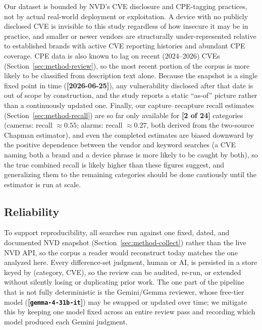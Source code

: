 \documentclass[conference]{IEEEtran}
\newcommand{\stub}[1][?]{{\color{red}\textbf{[#1]}}}
\begin{document}
Our dataset is bounded by NVD's CVE disclosure and CPE-tagging practices, not by actual
real-world deployment or exploitation. A device with no publicly disclosed CVE is
invisible to this study regardless of how insecure it may be in practice, and smaller or
newer vendors are structurally under-represented relative to established brands with
active CVE reporting histories and abundant CPE coverage. CPE data is also known to lag
on recent (2024--2026) CVEs (Section~\ref{sec:method-review}), so the most recent portion
of the corpus is more likely to be classified from description text alone. Because the
snapshot is a single fixed point in time (\stub[2026-06-25]), any vulnerability disclosed
after that date is out of scope by construction, and the study reports a static
``as-of'' picture rather than a continuously updated one. Finally, our capture--recapture
recall estimates (Section~\ref{sec:method-recall}) are so far only available for
\stub[2 of 24] categories (cameras: recall $\approx 0.55$; alarms: recall $\approx 0.27$,
both derived from the two-source Chapman estimator), and even the completed estimates are
biased downward by the positive dependence between the vendor and keyword searches (a CVE
naming both a brand and a device phrase is more likely to be caught by both), so the true
combined recall is likely higher than these figures suggest, and generalizing them to the
remaining categories should be done cautiously until the estimator is run at scale.

\subsection{Reliability}
\label{sec:threats-reliability}

To support reproducibility, all searches run against one fixed, dated, and documented
NVD snapshot (Section~\ref{sec:method-collect}) rather than the live NVD API, so the
corpus a reader would reconstruct today matches the one analyzed here. Every
difference-set judgment, human or AI, is persisted in a store keyed by
(category, CVE), so the review can be audited, re-run, or extended without silently
losing or duplicating prior work. The one part of the pipeline that is not fully
deterministic is the Gemini/Gemma reviewer, whose free-tier model
(\stub[\texttt{gemma-4-31b-it}]) may be swapped or updated over time; we mitigate this by
keeping one model fixed across an entire review pass and recording which model produced
each Gemini judgment.

\end{document}
